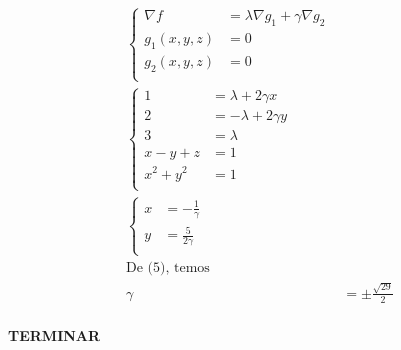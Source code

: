 \documentclass{article}
\begin{document}
            \begin{align*}
                \begin{cases}
                    \nabla f &= \lambda \nabla g_1 + \gamma \nabla g_2\\
                    g_1(x, y, z) &= 0\\
                    g_2(x, y, z) &= 0\\
                \end{cases}\\
                \begin{cases}
                    1 &= \lambda + 2\gamma x\\
                    2 &= -\lambda + 2\gamma y\\
                    3 &= \lambda\\
                    x - y + z &= 1\\
                    x^2 + y^2 &= 1\\
                \end{cases}\\
                \begin{cases}
                    x &= -\frac{1}{\gamma}\\
                    y &= \frac{5}{2\gamma}\\
                \end{cases}\\
                \text{De (5), temos}\\
                \gamma &= \pm \frac{\sqrt{29}}{2}\\
            \end{align*}

            \textbf{TERMINAR}
\end{document}
